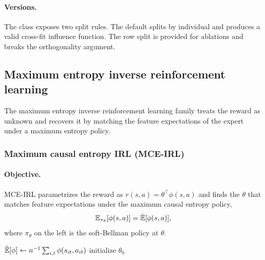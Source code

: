 \paragraph{Versions.} The  class exposes two split rules. The default splits by individual and produces a valid cross-fit influence function. The row split is provided for ablations and breaks the orthogonality argument.

\subsection{Maximum entropy inverse reinforcement learning}

The maximum entropy inverse reinforcement learning family treats the reward as unknown and recovers it by matching the feature expectations of the expert under a maximum entropy policy.

\subsubsection{Maximum causal entropy IRL (MCE-IRL)}

\paragraph{Objective.} MCE-IRL \citep{ziebart2010} parametrizes the reward as $r(s, a) = \theta^\top \phi(s, a)$ and finds the $\theta$ that matches feature expectations under the maximum causal entropy policy,
\begin{equation}
\mathbb{E}_{\pi_\theta}[\phi(s, a)] = \hat {\mathbb{E}}[\phi(s, a)],
\label{eq:mce}
\end{equation}
where $\pi_\theta$ on the left is the soft-Bellman policy at $\theta$.

\begin{algorithm}[H]
\SetAlgoLined
$\hat {\mathbb{E}}[\phi] \leftarrow n^{-1} \sum_{i,t} \phi(s_{it}, a_{it})$\;
initialize $\theta_0$\;
\caption{Maximum causal entropy gradient path}
\end{algorithm}

